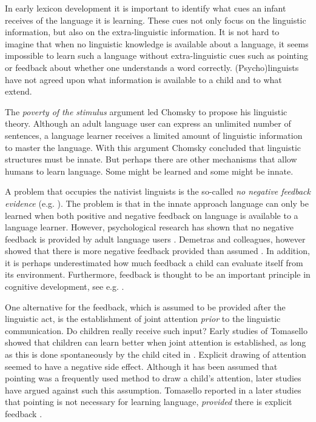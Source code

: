 In early lexicon development it is important to identify what cues an infant receives of the language it is learning. These cues not only focus on the linguistic information, but also on the extra-linguistic information. It is not hard to imagine that when no linguistic knowledge is available about a language, it seems impossible to learn such a language without extra-linguistic cues such as pointing or feedback about whether one understands a word correctly. (Psycho)linguists have not agreed upon what information is available to a child and to what extend.

The {\em poverty of the stimulus} argument led Chomsky to propose his linguistic theory. Although an adult language user can express an unlimited number of sentences, a language learner receives a limited amount of linguistic information to master the language. With this argument Chomsky concluded that linguistic structures must be innate. But perhaps there are other mechanisms that allow humans to learn language. Some might be learned and some might be innate.


A problem that occupies the nativist linguists is the so-called {\em no negative feedback evidence} (e.g. \citep{bowerman:1988}). The problem is that in the innate approach language can only be learned when both positive and negative feedback on language is available to a language learner. However, psychological research has shown that no negative feedback is provided by adult language users \citep{braine:1971}. Demetras and colleagues, however showed that there is more negative feedback provided than assumed \citep{demetrasetal:1986}. In addition, it is perhaps underestimated how much feedback a child can evaluate itself from its environment. Furthermore, feedback is thought to be an important principle in cognitive development, see e.g. \citep{clancey:1997}.


One alternative for the feedback, which is assumed to be provided after the linguistic act, is the establishment of joint attention {\em prior} to the linguistic communication. Do children really receive such input? Early studies of Tomasello showed that children can learn better when joint attention is established, as long as this is done spontaneously by the child \citep{tomaselloetal:1986} cited in \citep{barrett:1995}. Explicit drawing of attention seemed to have a negative side effect. Although it has been assumed that pointing was a frequently used method to draw a child's attention, later studies have argued against such this assumption. Tomasello reported in a later studies that pointing is not necessary for learning language, {\em provided} there is explicit feedback \citep{tomasellobarton:1994}. 

